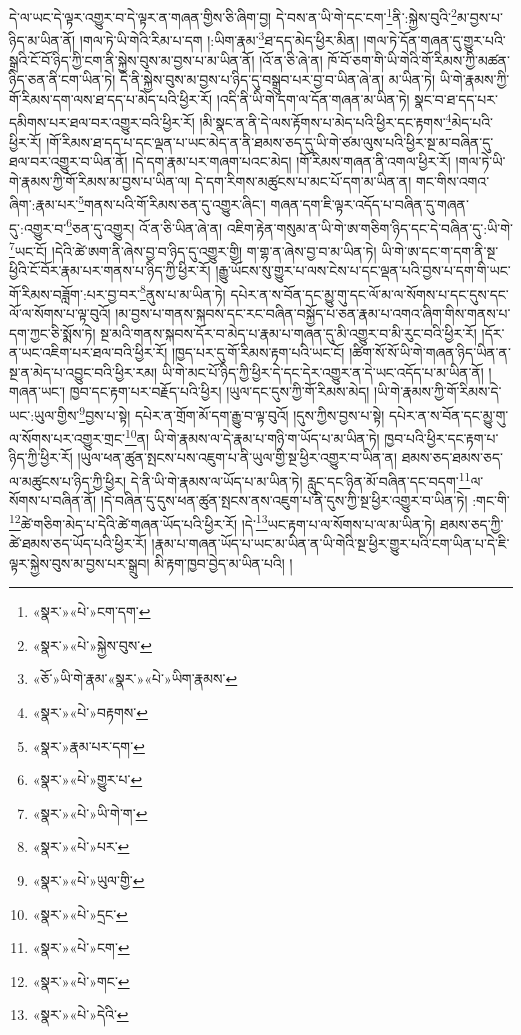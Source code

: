 དེ་ལ་ཡང་དེ་ལྟར་འགྱུར་བ་དེ་ལྟར་ན་གཞན་གྱིས་ཅི་ཞིག་བྱ། དེ་བས་ན་ཡི་གེ་དང་ངག་\footnote{«སྣར་»«པེ་»ངག་དག་}ནི་:སྐྱེས་བུའི་\footnote{«སྣར་»«པེ་»སྐྱེས་བུས་}མ་བྱས་པ་ཉིད་མ་ཡིན་ནོ། །གལ་ཏེ་ཡི་གེའི་རིམ་པ་དག །:ཡིག་རྣམ་\footnote{«ཅོ་»ཡི་གེ་རྣམ་«སྣར་»«པེ་»ཡིག་རྣམས་}ཐ་དད་མེད་ཕྱིར་མིན། །གལ་ཏེ་དོན་གཞན་དུ་གྱུར་པའི་སྒྲའི་ངོ་བོ་ཉིད་ཀྱི་ངག་ནི་སྐྱེས་བུས་མ་བྱས་པ་མ་ཡིན་ནོ། །འོ་ན་ཅི་ཞེ་ན། ཁོ་བོ་ཅག་གི་ཡི་གེའི་གོ་རིམས་ཀྱི་མཚན་ཉིད་ཅན་ནི་ངག་ཡིན་ཏེ། དེ་ནི་སྐྱེས་བུས་མ་བྱས་པ་ཉིད་དུ་བསྒྲུབ་པར་བྱ་བ་ཡིན་ཞེ་ན། མ་ཡིན་ཏེ། ཡི་གེ་རྣམས་ཀྱི་གོ་རིམས་དག་ལས་ཐ་དད་པ་མེད་པའི་ཕྱིར་རོ། །འདི་ནི་ཡི་གེ་དག་ལ་དོན་གཞན་མ་ཡིན་ཏེ། སྣང་བ་ཐ་དད་པར་དམིགས་པར་ཐལ་བར་འགྱུར་བའི་ཕྱིར་རོ། །མི་སྣང་ན་ནི་དེ་ལས་རྟོགས་པ་མེད་པའི་ཕྱིར་དང་རྟགས་\footnote{«སྣར་»«པེ་»བརྟགས་}མེད་པའི་ཕྱིར་རོ། །གོ་རིམས་ཐ་དད་པ་དང་ལྡན་པ་ཡང་མེད་ན་ནི་ཐམས་ཅད་དུ་ཡི་གེ་ཙམ་ལུས་པའི་ཕྱིར་སྔ་མ་བཞིན་དུ་ཐལ་བར་འགྱུར་བ་ཡིན་ནོ། །དེ་དག་རྣམ་པར་གཞག་པའང་མེད། །གོ་རིམས་གཞན་ནི་འགལ་ཕྱིར་རོ། །གལ་ཏེ་ཡི་གེ་རྣམས་ཀྱི་གོ་རིམས་མ་བྱས་པ་ཡིན་ལ། དེ་དག་རིགས་མཚུངས་པ་མང་པོ་དག་མ་ཡིན་ན། གང་གིས་འགའ་ཞིག་:རྣམ་པར་\footnote{«སྣར་»རྣམ་པར་དག་}གནས་པའི་གོ་རིམས་ཅན་དུ་འགྱུར་ཞིང་། གཞན་དག་ཇི་ལྟར་འདོད་པ་བཞིན་དུ་གཞན་དུ་:འགྱུར་བ་\footnote{«སྣར་»«པེ་»གྱུར་པ་}ཅན་དུ་འགྱུར། འོ་ན་ཅི་ཡིན་ཞེ་ན། འཇིག་རྟེན་གསུམ་ན་ཡི་གེ་ཨ་གཅིག་ཉིད་དང་དེ་བཞིན་དུ་:ཡི་གེ་\footnote{«སྣར་»«པེ་»ཡི་གེ་ག་}ཡང་ངོ། །དེའི་ཚེ་ཨག་ནི་ཞེས་བྱ་བ་ཉིད་དུ་འགྱུར་གྱི། ག་གྷ་ན་ཞེས་བྱ་བ་མ་ཡིན་ཏེ། ཡི་གེ་ཨ་དང་ག་དག་ནི་སྔ་ཕྱིའི་ངོ་བོར་རྣམ་པར་གནས་པ་ཉིད་ཀྱི་ཕྱིར་རོ། །རྒྱུ་ཡོངས་སུ་གྱུར་པ་ལས་ངེས་པ་དང་ལྡན་པའི་བྱས་པ་དག་གི་ཡང་གོ་རིམས་བཟློག་:པར་བྱ་བར་\footnote{«སྣར་»«པེ་»པར་}ནུས་པ་མ་ཡིན་ཏེ། དཔེར་ན་ས་བོན་དང་མྱུ་གུ་དང་ལོ་མ་ལ་སོགས་པ་དང་དུས་དང་ལོ་ལ་སོགས་པ་ལྟ་བུའོ། །མ་བྱས་པ་གནས་སྐབས་དང་རང་བཞིན་བསྐྱོད་པ་ཅན་རྣམ་པ་འགའ་ཞིག་གིས་གནས་པ་དག་ཀྱང་ཅི་སྨོས་ཏེ། སྔ་མའི་གནས་སྐབས་དོར་བ་མེད་པ་རྣམ་པ་གཞན་དུ་མི་འགྱུར་བ་མི་རུང་བའི་ཕྱིར་རོ། །དོར་ན་ཡང་འཇིག་པར་ཐལ་བའི་ཕྱིར་རོ། །ཁྱད་པར་དུ་གོ་རིམས་རྟག་པའི་ཡང་ངོ། །ཚིག་སོ་སོ་ཡི་གེ་གཞན་ཉིད་ཡིན་ན་སྔ་ན་མེད་པ་འབྱུང་བའི་ཕྱིར་རམ། ཡི་གེ་མང་པོ་ཉིད་ཀྱི་ཕྱིར་དེ་དང་དེར་འགྱུར་ན་དེ་ཡང་འདོད་པ་མ་ཡིན་ནོ། །གཞན་ཡང་། ཁྱབ་དང་རྟག་པར་བརྗོད་པའི་ཕྱིར། །ཡུལ་དང་དུས་ཀྱི་གོ་རིམས་མེད། །ཡི་གེ་རྣམས་ཀྱི་གོ་རིམས་དེ་ཡང་:ཡུལ་གྱིས་\footnote{«སྣར་»«པེ་»ཡུལ་གྱི་}བྱས་པ་སྟེ། དཔེར་ན་གྲོག་མོ་དག་རྒྱུ་བ་ལྟ་བུའོ། །དུས་ཀྱིས་བྱས་པ་སྟེ། དཔེར་ན་ས་བོན་དང་མྱུ་གུ་ལ་སོགས་པར་འགྱུར་གྲང་\footnote{«སྣར་»«པེ་»དྲང་}ན། ཡི་གེ་རྣམས་ལ་དེ་རྣམ་པ་གཉི་ག་ཡོད་པ་མ་ཡིན་ཏེ། ཁྱབ་པའི་ཕྱིར་དང་རྟག་པ་ཉིད་ཀྱི་ཕྱིར་རོ། །ཡུལ་ཕན་ཚུན་སྤངས་པས་འཇུག་པ་ནི་ཡུལ་གྱི་སྔ་ཕྱིར་འགྱུར་བ་ཡིན་ན། ཐམས་ཅད་ཐམས་ཅད་ལ་མཚུངས་པ་ཉིད་ཀྱི་ཕྱིར། དེ་ནི་ཡི་གེ་རྣམས་ལ་ཡོད་པ་མ་ཡིན་ཏེ། རླུང་དང་ཉིན་མོ་བཞིན་དང་བདག་\footnote{«སྣར་»«པེ་»ངག་}ལ་སོགས་པ་བཞིན་ནོ། །དེ་བཞིན་དུ་དུས་ཕན་ཚུན་སྤངས་ནས་འཇུག་པ་ནི་དུས་ཀྱི་སྔ་ཕྱིར་འགྱུར་བ་ཡིན་ཏེ། :གང་གི་\footnote{«སྣར་»«པེ་»གང་}ཚེ་གཅིག་མེད་པ་དེའི་ཚེ་གཞན་ཡོད་པའི་ཕྱིར་རོ། །དེ་\footnote{«སྣར་»«པེ་»དེའི་}ཡང་རྟག་པ་ལ་སོགས་པ་ལ་མ་ཡིན་ཏེ། ཐམས་ཅད་ཀྱི་ཚེ་ཐམས་ཅད་ཡོད་པའི་ཕྱིར་རོ། །རྣམ་པ་གཞན་ཡོད་པ་ཡང་མ་ཡིན་ན་ཡི་གེའི་སྔ་ཕྱིར་གྱུར་པའི་ངག་ཡིན་པ་དེ་ཇི་ལྟར་སྐྱེས་བུས་མ་བྱས་པར་སྒྲུབ། མི་རྟག་ཁྱབ་བྱེད་མ་ཡིན་པའི། །

